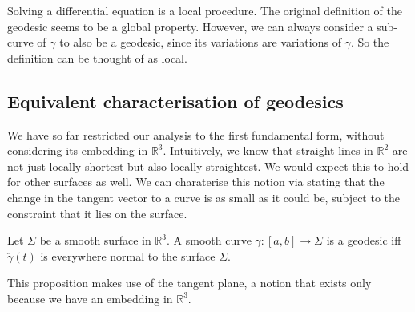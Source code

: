 \begin{remark}
	Solving a differential equation is a local procedure.
	The original definition of the geodesic seems to be a global property.
	However, we can always consider a sub-curve of $\gamma$ to also be a geodesic, since its variations are variations of $\gamma$.
	So the definition can be thought of as local.
\end{remark}

\subsection{Equivalent characterisation of geodesics}
We have so far restricted our analysis to the first fundamental form, without considering its embedding in $\mathbb R^3$.
Intuitively, we know that straight lines in $\mathbb R^2$ are not just locally shortest but also locally straightest.
We would expect this to hold for other surfaces as well.
We can charaterise this notion via stating that the change in the tangent vector to a curve is as small as it could be, subject to the constraint that it lies on the surface.

\begin{proposition} \label{prp:3.1}
	Let $\Sigma$ be a smooth surface in $\mathbb R^3$.
	A smooth curve $\gamma \colon [a,b] \to \Sigma$ is a geodesic iff $\ddot \gamma(t)$ is everywhere normal to the surface $\Sigma$.
\end{proposition}

\begin{remark}
	This proposition makes use of the tangent plane, a notion that exists only because we have an embedding in $\mathbb R^3$.
\end{remark}

